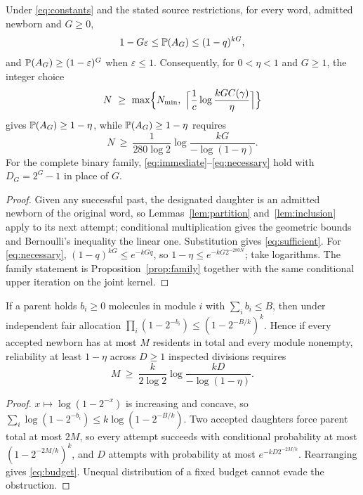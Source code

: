 \begin{theorem}\label{thm:immediate}
Under \eqref{eq:constants} and the stated source restrictions, for every word, admitted newborn and $G\ge0$,
\begin{equation}\label{eq:immediate}
 1-G\varepsilon\le\mathbb P(A_G)\le(1-q)^{kG},
\end{equation}
and $\mathbb P(A_G)\ge(1-\varepsilon)^G$ when $\varepsilon\le1$. Consequently, for $0<\eta<1$ and $G\ge1$, the integer choice
\begin{equation}\label{eq:sufficient}
 N\ \ge\ \max\Bigl\{N_{\min},\ \Bigl\lceil\frac1c\log\frac{kGC(\gamma)}\eta\Bigr\rceil\Bigr\}
\end{equation}
gives $\mathbb P(A_G)\ge1-\eta$, while $\mathbb P(A_G)\ge1-\eta$ requires
\begin{equation}\label{eq:necessary}
 N\ \ge\ \frac1{280\log2}\log\frac{kG}{-\log(1-\eta)} .
\end{equation}
For the complete binary family, \eqref{eq:immediate}--\eqref{eq:necessary} hold with $D_G=2^G-1$ in place of $G$.
\end{theorem}
\begin{proof}
Given any successful past, the designated daughter is an admitted newborn of the original word, so Lemmas~\ref{lem:partition} and~\ref{lem:inclusion} apply to its next attempt; conditional multiplication gives the geometric bounds and Bernoulli's inequality the linear one. Substitution gives \eqref{eq:sufficient}. For \eqref{eq:necessary}, $(1-q)^{kG}\le e^{-kGq}$, so $1-\eta\le e^{-kG2^{-280N}}$; take logarithms. The family statement is Proposition~\ref{prop:family} together with the same conditional upper iteration on the joint kernel.
\end{proof}

\begin{proposition}\label{prop:unequal}
If a parent holds $b_i\ge0$ molecules in module $i$ with $\sum_ib_i\le B$, then under independent fair allocation $\prod_i(1-2^{-b_i})\le(1-2^{-B/k})^k$. Hence if every accepted newborn has at most $M$ residents in total and every module nonempty, reliability at least $1-\eta$ across $D\ge1$ inspected divisions requires
\begin{equation}\label{eq:budget}
 M\ \ge\ \frac{k}{2\log2}\log\frac{kD}{-\log(1-\eta)} .
\end{equation}
\end{proposition}
\begin{proof}
$x\mapsto\log(1-2^{-x})$ is increasing and concave, so $\sum_i\log(1-2^{-b_i})\le k\log(1-2^{-B/k})$. Two accepted daughters force parent total at most $2M$, so every attempt succeeds with conditional probability at most $(1-2^{-2M/k})^k$, and $D$ attempts with probability at most $e^{-kD2^{-2M/k}}$. Rearranging gives \eqref{eq:budget}. Unequal distribution of a fixed budget cannot evade the obstruction.
\end{proof}

